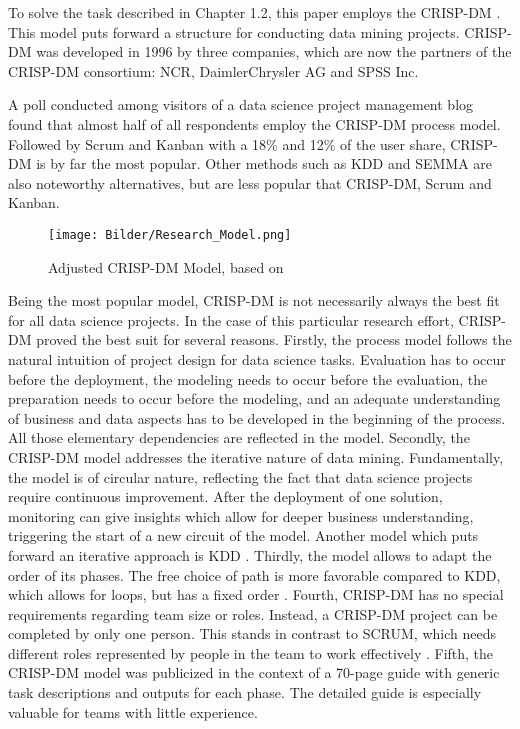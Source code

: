 To solve the task described in Chapter 1.2, this paper employs the \ac{CRISP-DM} \cite{CRISPDM2000}. This model puts forward a structure for conducting data mining projects. \ac{CRISP-DM} was developed in 1996 by three companies, which are now the partners of the \ac{CRISP-DM} consortium: NCR, DaimlerChrysler AG and SPSS Inc. 

A poll \cite{CRISPDMPopular2020} conducted among visitors of a data science project management blog found that almost half of all respondents employ the \ac{CRISP-DM} process model. Followed by Scrum and Kanban with a 18\% and 12\% of the user share, \ac{CRISP-DM} is by far the most popular. Other methods such as \ac{KDD} and \ac{SEMMA} are also noteworthy alternatives, but are less popular that CRISP-DM, Scrum and Kanban.

\begin{figure}[ht]
	\centering
	\texttt{[image: Bilder/Research\_Model.png]}
	\caption[Adjusted CRISP-DM Model]{Adjusted CRISP-DM Model, based on \cite[p.~13]{CRISPDM2000}}
	\label{fig:CRISM-DM}
\end{figure}

Being the most popular model, \ac{CRISP-DM} is not necessarily always the best fit for all data science projects. In the case of this particular research effort, \ac{CRISP-DM} proved the best suit for several reasons.
Firstly, the process model follows the natural intuition of project design for data science tasks. Evaluation has to occur before the deployment, the modeling needs to occur before the evaluation, the preparation needs to occur before the modeling, and an adequate understanding of business and data aspects has to be developed in the beginning of the process. All those elementary dependencies are reflected in the model.
Secondly, the \ac{CRISP-DM} model addresses the iterative nature of data mining. Fundamentally, the model is of circular nature, reflecting the fact that data science projects require continuous improvement. After the deployment of one solution, monitoring can give insights which allow for deeper business understanding, triggering the start of a new circuit of the model. Another model which puts forward an iterative approach is \ac{KDD} \cite[p.~41]{KDD}.
Thirdly, the model allows to adapt the order of its phases. The free choice of path is more favorable compared to \ac{KDD}, which allows for loops, but has a fixed order \cite[p.~42]{KDD}.
Fourth, \ac{CRISP-DM} has no special requirements regarding team size or roles. Instead, a \ac{CRISP-DM} project can be completed by only one person. This stands in contrast to SCRUM, which needs different roles represented by people in the team to work effectively \cite{SCRUMSolo}. 
Fifth, the \ac{CRISP-DM} model was publicized in the context of a 70-page guide with generic task descriptions and outputs for each phase. The detailed guide is especially valuable for teams with little experience.

